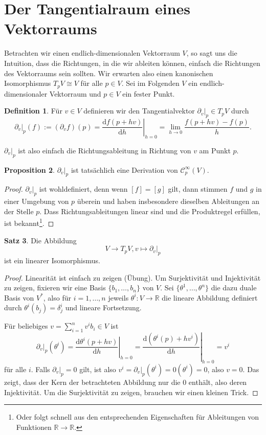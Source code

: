 \documentclass[a4paper]{scrreprt}
\numberwithin{equation}{chapter}
\newcommand{\D}{\mathrm{d}}
\newcommand{\sC}{\mathcal{C}^{\infty}}
\theoremstyle{definition}
\newtheorem{defn}{Definition}[section]
\newtheorem{prop}[defn]{Proposition}
\newtheorem{satz}[defn]{Satz}
\begin{document}
\section{Der Tangentialraum eines Vektorraums}

Betrachten wir einen endlich-dimensionalen Vektorraum $V$, so sagt uns die Intuition, dass die Richtungen, in die wir ableiten können, einfach die Richtungen des Vektorraums sein sollten. Wir erwarten also einen kanonischen Isomorphismus $T_pV \cong V$ für alle $p \in V$. Sei im Folgenden $V$ ein endlich-dimensionaler Vektorraum und $p \in V$ ein fester Punkt.
\begin{defn}
	Für $v \in V$ definieren wir den Tangentialvektor $\left.\partial_v\right|_p \in T_pV$ durch
	\[\left.\partial_v\right|_p(f) := (\partial_v f)(p) = \left.\frac{\D f(p + h v)}{\D h}\right|_{h=0} = \lim_{h\to 0} \frac{f(p + h v) - f(p)}{h}.\]
\end{defn}
$\left.\partial_v\right|_p$ ist also einfach die Richtungsableitung in Richtung von $v$ am Punkt $p$.
\begin{prop}
	$\left.\partial_v\right|_p$ ist tatsächlich eine Derivation von $\sC_p(V)$.
	
	\begin{proof}
		$\left.\partial_v\right|_p$ ist wohldefiniert, denn wenn $[f] = [g]$ gilt, dann stimmen $f$ und $g$ in einer Umgebung von $p$ überein und haben insbesondere dieselben Ableitungen an der Stelle $p$. Dass Richtungsableitungen linear sind und die Produktregel erfüllen, ist bekannt\footnote{Oder folgt schnell aus den entsprechenden Eigenschaften für Ableitungen von Funktionen $\mathbb R \to \mathbb R$.}.
	\end{proof}
\end{prop}

\begin{satz} \label{satz:tangt_vr}
	Die Abbildung \[V \to T_pV, v \mapsto \left.\partial_v\right|_p\] ist ein linearer Isomorphismus.
	
	\begin{proof}\let\qed\relax
		Linearität ist einfach zu zeigen (Übung). Um Surjektivität und Injektivität zu zeigen, fixieren wir eine Basis $\{b_1,\dots,b_n\}$ von $V$. Sei $\{\theta^1, \dots, \theta^n\}$ die dazu duale Basis von $V^*$, also für $i = 1, \dots, n$ jeweils $\theta^i\colon V \to \mathbb R$ die lineare Abbildung definiert durch $\theta^i(b_j) = \delta^i_j$ und lineare Fortsetzung.

		Für beliebiges $v = \sum_{i=1}^n v^i b_i \in V$ ist
		\begin{equation} \label{eq:pf_tangt_vr}
			\left.\partial_v\right|_p(\theta^i) = \left.\frac{\D\theta^i(p + h v)}{\D h}\right|_{h=0} = \left.\frac{\D(\theta^i(p) + h v^i)}{\D h}\right|_{h=0} = v^i
		\end{equation}
		für alle $i$. Falls $\left.\partial_v\right|_p = 0$ gilt, ist also $v^i = \left.\partial_v\right|_p(\theta^i) = 0(\theta^i) = 0$, also $v=0$. Das zeigt, dass der Kern der betrachteten Abbildung nur die 0 enthält, also deren Injektivität. Um die Surjektivität zu zeigen, brauchen wir einen kleinen Trick.
	\end{proof}
\end{satz}
\end{document}
